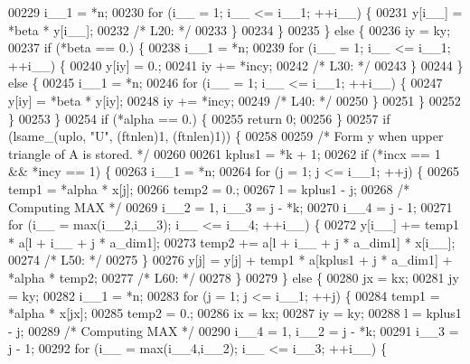 \begin{DoxyCode}
00229         i\_\_1 = *n;
00230         \textcolor{keywordflow}{for} (i\_\_ = 1; i\_\_ <= i\_\_1; ++i\_\_) \{
00231             y[i\_\_] = *beta * y[i\_\_];
00232 \textcolor{comment}{/* L20: */}
00233         \}
00234         \}
00235     \} \textcolor{keywordflow}{else} \{
00236         iy = ky;
00237         \textcolor{keywordflow}{if} (*beta == 0.) \{
00238         i\_\_1 = *n;
00239         \textcolor{keywordflow}{for} (i\_\_ = 1; i\_\_ <= i\_\_1; ++i\_\_) \{
00240             y[iy] = 0.;
00241             iy += *incy;
00242 \textcolor{comment}{/* L30: */}
00243         \}
00244         \} \textcolor{keywordflow}{else} \{
00245         i\_\_1 = *n;
00246         \textcolor{keywordflow}{for} (i\_\_ = 1; i\_\_ <= i\_\_1; ++i\_\_) \{
00247             y[iy] = *beta * y[iy];
00248             iy += *incy;
00249 \textcolor{comment}{/* L40: */}
00250         \}
00251         \}
00252     \}
00253     \}
00254     \textcolor{keywordflow}{if} (*alpha == 0.) \{
00255     \textcolor{keywordflow}{return} 0;
00256     \}
00257     \textcolor{keywordflow}{if} (lsame\_(uplo, \textcolor{stringliteral}{"U"}, (ftnlen)1, (ftnlen)1)) \{
00258 
00259 \textcolor{comment}{/*        Form  y  when upper triangle of A is stored. */}
00260 
00261     kplus1 = *k + 1;
00262     \textcolor{keywordflow}{if} (*incx == 1 && *incy == 1) \{
00263         i\_\_1 = *n;
00264         \textcolor{keywordflow}{for} (j = 1; j <= i\_\_1; ++j) \{
00265         temp1 = *alpha * x[j];
00266         temp2 = 0.;
00267         l = kplus1 - j;
00268 \textcolor{comment}{/* Computing MAX */}
00269         i\_\_2 = 1, i\_\_3 = j - *k;
00270         i\_\_4 = j - 1;
00271         \textcolor{keywordflow}{for} (i\_\_ = max(i\_\_2,i\_\_3); i\_\_ <= i\_\_4; ++i\_\_) \{
00272             y[i\_\_] += temp1 * a[l + i\_\_ + j * a\_dim1];
00273             temp2 += a[l + i\_\_ + j * a\_dim1] * x[i\_\_];
00274 \textcolor{comment}{/* L50: */}
00275         \}
00276         y[j] = y[j] + temp1 * a[kplus1 + j * a\_dim1] + *alpha * temp2;
00277 \textcolor{comment}{/* L60: */}
00278         \}
00279     \} \textcolor{keywordflow}{else} \{
00280         jx = kx;
00281         jy = ky;
00282         i\_\_1 = *n;
00283         \textcolor{keywordflow}{for} (j = 1; j <= i\_\_1; ++j) \{
00284         temp1 = *alpha * x[jx];
00285         temp2 = 0.;
00286         ix = kx;
00287         iy = ky;
00288         l = kplus1 - j;
00289 \textcolor{comment}{/* Computing MAX */}
00290         i\_\_4 = 1, i\_\_2 = j - *k;
00291         i\_\_3 = j - 1;
00292         \textcolor{keywordflow}{for} (i\_\_ = max(i\_\_4,i\_\_2); i\_\_ <= i\_\_3; ++i\_\_) \{

\end{DoxyCode}

